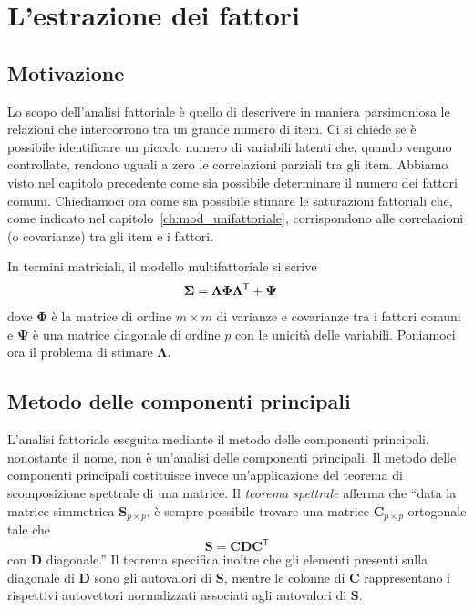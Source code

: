 \chapter{L'estrazione dei fattori}
\label{ch:estrazione}


\section*{Motivazione}

Lo scopo dell'analisi fattoriale è quello di descrivere in maniera parsimoniosa le relazioni che intercorrono tra un grande numero di item. Ci si chiede se è possibile identificare un piccolo numero di variabili latenti che, quando vengono controllate, rendono uguali a zero le correlazioni parziali tra gli item. Abbiamo visto nel capitolo precedente come sia possibile determinare il numero dei fattori comuni. Chiediamoci ora come sia possibile stimare le saturazioni fattoriali che, come indicato nel capitolo~\ref{ch:mod_unifattoriale}, corrispondono alle correlazioni (o covarianze) tra gli item e i fattori.

In termini matriciali, il modello multifattoriale  si scrive
\begin{align}
\boldsymbol{\Sigma} &=\boldsymbol{\Lambda} \boldsymbol{\Phi} \boldsymbol{\Lambda}^{\ensuremath{\mathsf{T}}} + \boldsymbol{\Psi} \notag
\end{align}
dove $\boldsymbol{\Phi}$ è la matrice di ordine $m \times m$ di varianze e covarianze tra i fattori comuni e $\boldsymbol{\Psi}$ è una matrice diagonale  di ordine $p$ con le unicità delle variabili. Poniamoci ora il problema di stimare $\boldsymbol{\Lambda}$.


\section{Metodo delle componenti principali}

L'analisi fattoriale eseguita mediante il metodo  delle
    componenti principali, nonostante il nome, non è un'analisi
    delle componenti principali. Il metodo delle componenti principali costituisce invece un'applicazione del teorema di scomposizione spettrale di una matrice.
Il \emph{teorema spettrale} afferma che ``data la matrice simmetrica $\textbf{S}_{p \times p}$, 
è sempre possibile trovare una matrice $\textbf{C}_{p \times p}$ ortogonale tale che 
\begin{equation}
\textbf{S} = \textbf{C}\textbf{D}\textbf{C}^{\ensuremath{\mathsf{T}}}
\end{equation}
con \textbf{D} diagonale.''  
 Il teorema specifica inoltre che gli elementi presenti sulla diagonale 
di  \textbf{D} sono gli autovalori di  \textbf{S}, mentre le colonne di  \textbf{C} rappresentano i 
rispettivi autovettori normalizzati associati agli autovalori di
\textbf{S}. 

